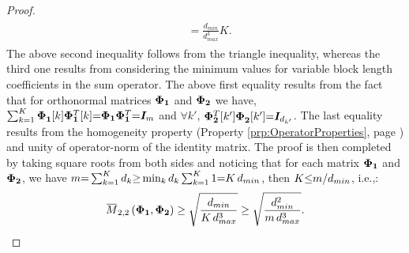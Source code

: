 \begin{proof}
\begin{gather*}
\begin{aligned}
&= \frac{d_{min}}{d^{3}_{max}} K.
\end{aligned}
\end{gather*}
The above second inequality follows from the triangle inequality, whereas the third one results from considering the minimum values for variable block length coefficients in the sum operator.
The above first equality results from the fact that for orthonormal matrices $\boldsymbol{\Phi}_{\boldsymbol{1}}$ and $\boldsymbol{\Phi}_{\boldsymbol{2}}$ we have, $\sum_{k=1}^K \boldsymbol{\Phi}_{\boldsymbol{1}}^{ } [k] \boldsymbol{\Phi}_{\boldsymbol{1}}^T [k] {=} \boldsymbol{\Phi}_{\boldsymbol{1}} \boldsymbol{\Phi}_{\boldsymbol{1}}^T {=} \boldsymbol{I}_m$ and $\forall k'$, $\boldsymbol{\Phi}_{\boldsymbol{2}}^T [k'] \boldsymbol{\Phi}_{\boldsymbol{2}} ^{ } [k'] {=} \boldsymbol{I}_{d_{k'}}$.
The last equality results from the homogeneity property (Property \ref{prp:OperatorProperties}, page \pageref{prp:OperatorProperties}) and unity of operator-norm of the identity matrix.
The proof is then completed by taking square roots from both sides and noticing that for each matrix $\boldsymbol{\Phi}_{\boldsymbol{1}}$ and $\boldsymbol{\Phi}_{\boldsymbol{2}}$, we have $m {=} \sum_{k {=} 1}^K d_k {\geq} \min_k d_k \sum_{k {=} 1}^K 1 {=} K \, d_{min}$, then $K {\leq} m / d_{min}$, i.e.,:
\begin{gather*}
\overbar{M}_{2,2}\myparanthese{\myPhiOne , \myPhiTwo} 
\geq \sqrt{\frac{d_{min}}{K \, d^{3}_{max}}} 
\geq \sqrt{\frac{d^2_{min}}{m \, d^{3}_{max}}}.
\end{gather*}  
\end{proof}